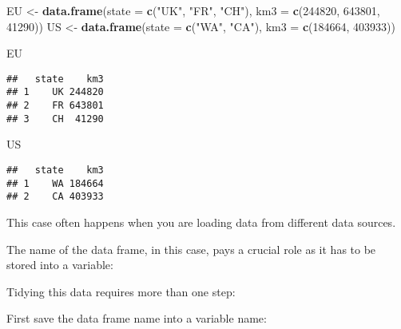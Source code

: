 \documentclass[]{book}
\newenvironment{Shaded}{\begin{snugshade}}{\end{snugshade}}
\newcommand{\KeywordTok}[1]{\textcolor[rgb]{0.13,0.29,0.53}{\textbf{{#1}}}}
\newcommand{\DataTypeTok}[1]{\textcolor[rgb]{0.13,0.29,0.53}{{#1}}}
\newcommand{\DecValTok}[1]{\textcolor[rgb]{0.00,0.00,0.81}{{#1}}}
\newcommand{\StringTok}[1]{\textcolor[rgb]{0.31,0.60,0.02}{{#1}}}
\newcommand{\NormalTok}[1]{{#1}}
\begin{document}
\begin{Shaded}
\begin{Highlighting}[]
\NormalTok{EU <-}\StringTok{ }\KeywordTok{data.frame}\NormalTok{(}\DataTypeTok{state =} \KeywordTok{c}\NormalTok{(}\StringTok{"UK"}\NormalTok{, }\StringTok{"FR"}\NormalTok{, }\StringTok{"CH"}\NormalTok{), }\DataTypeTok{km3 =} \KeywordTok{c}\NormalTok{(}\DecValTok{244820}\NormalTok{, }\DecValTok{643801}\NormalTok{, }\DecValTok{41290}\NormalTok{))}
\NormalTok{US <-}\StringTok{ }\KeywordTok{data.frame}\NormalTok{(}\DataTypeTok{state =} \KeywordTok{c}\NormalTok{(}\StringTok{"WA"}\NormalTok{, }\StringTok{"CA"}\NormalTok{), }\DataTypeTok{km3 =} \KeywordTok{c}\NormalTok{(}\DecValTok{184664}\NormalTok{, }\DecValTok{403933}\NormalTok{))}

\NormalTok{EU}
\end{Highlighting}
\end{Shaded}

\begin{verbatim}
##   state    km3
## 1    UK 244820
## 2    FR 643801
## 3    CH  41290
\end{verbatim}

\begin{Shaded}
\begin{Highlighting}[]
\NormalTok{US}
\end{Highlighting}
\end{Shaded}

\begin{verbatim}
##   state    km3
## 1    WA 184664
## 2    CA 403933
\end{verbatim}

This case often happens when you are loading data from different data
sources.

The name of the data frame, in this case, pays a crucial role as it has
to be stored into a variable:

Tidying this data requires more than one step:

First save the data frame name into a variable name:

\begin{Shaded}
\end{Shaded}
\end{document}
